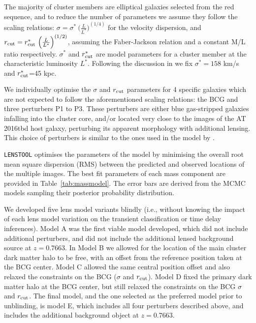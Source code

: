 \documentclass[12pt]{article}
\def\SNABC{AT 2016tbd\xspace}
\def\lenstool{{\tt LENSTOOL}\xspace}
\begin{document}
{The majority of cluster members are elliptical galaxies selected from the red sequence, and to reduce the number of parameters we assume they follow the scaling relations: $\sigma=\sigma^*\ {\Big(\frac{L}{L^*}\Big)}^{(1/4)}$ for the velocity dispersion, 
and $r_{\rm cut}=r_{\rm cut}^*\ {\Big(\frac{L}{L^*}\Big)}^{(1/2)}$, assuming the Faber-Jackson relation and a constant M/L ratio respectively. $\sigma^*$ and $r^*_{\rm cut}$ are model parameters for a cluster member at the characteristic luminosity $L^*$.  Following the discussion in \cite{richard_locuss_2010} we fix $\sigma^*=158$ km/s and $r_{\rm cut}^*$=45 kpc. 

We individually optimise the $\sigma$ and $r_{\rm cut}$ parameters for 4 specific galaxies which are not expected to follow the aforementioned scaling relations: the BCG and three perturbers P1 to P3. These perturbers are either blue gas-stripped galaxies infalling into the cluster core, and/or located very close to the images of the \SNABC host galaxy, perturbing its apparent morphology with additional lensing. This choice of perturbers is similar to the ones used in the model by \cite{newman_resolving_2018}.

\lenstool optimises the parameters of the model by minimising the overall root mean square dispersion (RMS) between the predicted and observed locations of the multiple images. The best fit parameters of each mass component are provided in Table~\ref{tab:massmodel}. The error bars are derived from the MCMC models sampling their posterior probability distribution. 

We developed five lens model variants blindly (i.e., without knowing the impact of each lens model variation on the transient classification or time delay inferences). Model A was the first viable model developed, which did not include additional perturbers, and did not include the additional lensed background source at $z=0.7663$.   In Model B we allowed for the location of the main cluster dark matter halo to be free, with an offset from the reference position taken at the BCG center.  Model C allowed the same central position offset and also relaxed the constraints on the BCG ($\sigma$ and $r_{\rm cut}$).  Model D fixed the primary dark matter halo at the BCG center, but still relaxed the constraints on the BCG $\sigma$ and $r_{\rm cut}$.
The final model, and the one selected as the preferred model prior to unblinding, is model E, which includes all four perturbers described above, and includes the additional background object at $z=0.7663$.

}
\end{document}
